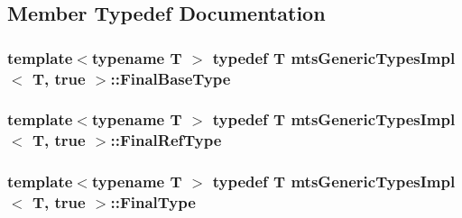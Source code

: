 \subsection{Member Typedef Documentation}
\hypertarget{classmts_generic_types_impl_3_01_t_00_01true_01_4_a3d735609254b24b78bc37157a3d9ce35}{
\subsubsection[{Final\-Base\-Type}]{\setlength{\rightskip}{0pt plus 5cm}template$<$typename T $>$ typedef T {\bf mts\-Generic\-Types\-Impl}$<$ T, true $>$\-::{\bf Final\-Base\-Type}}}\label{classmts_generic_types_impl_3_01_t_00_01true_01_4_a3d735609254b24b78bc37157a3d9ce35}
\hypertarget{classmts_generic_types_impl_3_01_t_00_01true_01_4_a76ded5912b20f9057bf7835ca04cfb89}{
\subsubsection[{Final\-Ref\-Type}]{\setlength{\rightskip}{0pt plus 5cm}template$<$typename T $>$ typedef T {\bf mts\-Generic\-Types\-Impl}$<$ T, true $>$\-::{\bf Final\-Ref\-Type}}}\label{classmts_generic_types_impl_3_01_t_00_01true_01_4_a76ded5912b20f9057bf7835ca04cfb89}
\hypertarget{classmts_generic_types_impl_3_01_t_00_01true_01_4_a1ff3e9267a5ad6d54eaec1c50114bca2}{
\subsubsection[{Final\-Type}]{\setlength{\rightskip}{0pt plus 5cm}template$<$typename T $>$ typedef T {\bf mts\-Generic\-Types\-Impl}$<$ T, true $>$\-::{\bf Final\-Type}}}\label{classmts_generic_types_impl_3_01_t_00_01true_01_4_a1ff3e9267a5ad6d54eaec1c50114bca2}


